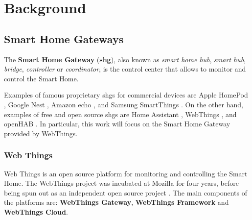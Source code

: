 \chapter{Background}
\label{background}

\section{Smart Home Gateways}
The \textbf{Smart Home Gateway} (\textbf{\gls{shg}}), also known as \textit{smart home hub}, \textit{smart hub}, \textit{bridge}, \textit{controller} or \textit{coordinator}, is the control center that allows to monitor and control the Smart Home.


Examples of famous proprietary  \glspl{shg} for commercial devices are Apple HomePod \cite{applehomepodhome}, Google Nest \cite{googlenesthome}, Amazon echo \cite{amazonecho}, and Samsung SmartThings \cite{smartthingshome}. On the other hand, examples of free and open source \glspl{shg} are Home Assistant \cite{homehomeassistant},  WebThings \cite{wthomepage}, and openHAB \cite{openhabhomepage}. In particular, this work will focus on the Smart Home Gateway provided by WebThings.


\subsection{Web Things}
Web Things is an open source platform for monitoring and controlling the Smart Home. The WebThings project was incubated at Mozilla for four years, before being spun out as an independent open source project \cite{wtabout}. The main components of the platforms are: \textbf{WebThings Gateway}, \textbf{WebThings Framework} and \textbf{WebThings Cloud}.

